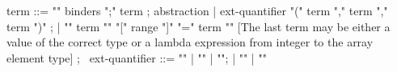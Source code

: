 \begin{syntax}
term ::= "\lambda" binders ";" term ; abstraction
| ext-quantifier "(" term "," term "," term ")" ;
| { "{" term "\with" "[" range "]" "=" term "}" } [The last term may be either a value of the correct type or a lambda expression from integer to the array element type] ;
\
ext-quantifier ::= "\max" | "\min" | "\sum";
                      | "\product" | "\numof"
\end{syntax}
